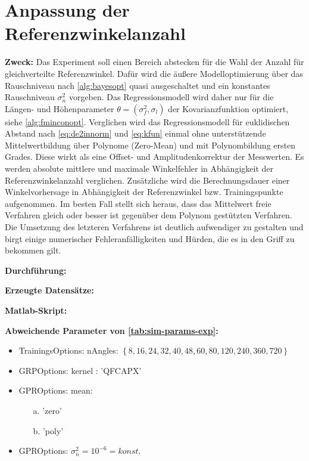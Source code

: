 \section{Anpassung der Referenzwinkelanzahl}\label{sec:exp2}


\textbf{Zweck:} Das Experiment soll einen Bereich abstecken für die Wahl der Anzahl für gleichverteilte Referenzwinkel. Dafür wird die äußere Modelloptimierung über das Rauschniveau nach \autoref{alg:bayesopt} quasi ausgeschaltet und ein konstantes Rauschniveau $\sigma_n^2$ vorgeben. Das Regressionsmodell wird daher nur für die Längen- und Höhenparameter $\theta = (\sigma_f^2, \sigma_l)$ der Kovarianzfunktion optimiert, siehe \autoref{alg:fminconopt}. Verglichen wird das Regressionsmodell für euklidischen Abstand nach \autoref{eq:de2innorm} und \autoref{eq:kfun} einmal ohne unterstützende Mittelwertbildung über Polynome (Zero-Mean) und mit Polynombildung ersten Grades. Diese wirkt als eine Offset- und Amplitudenkorrektur der Messwerten.
Es werden absolute mittlere und maximale Winkelfehler in Abhängigkeit der Referenzwinkelanzahl verglichen. Zusätzliche wird die Berechnungsdauer einer Winkelvorhersage in Abhängigkeit der Referenzwinkel bzw. Trainingspunkte aufgenommen.
Im besten Fall stellt sich heraus, dass das Mittelwert freie Verfahren gleich oder besser ist gegenüber dem Polynom gestützten Verfahren. Die Umsetzung des letzteren Verfahrens ist deutlich aufwendiger zu gestalten und birgt einige numerischer Fehleranfälligkeiten und Hürden, die es in den Griff zu bekommen gilt.

\textbf{Durchführung:} 

\textbf{Erzeugte Datensätze:}

\textbf{Matlab-Skript:}

\textbf{Abweichende Parameter von \autoref{tab:sim-params-exp}:}

\begin{itemize}
	\item TrainingsOptions: nAngles: $\left\{ 8, 16, 24, 32, 40, 48, 60, 80, 120, 240, 360, 720 \right\}$
	\item GRPOptions: kernel : 'QFCAPX'
	\item GPROptions: mean: 
	\begin{itemize}
		\item[a.] 'zero'
		\item[b.] 'poly'
	\end{itemize}
	\item GPROptions: $\sigma_n^2 = 10^{-6} = konst.$
\end{itemize}

